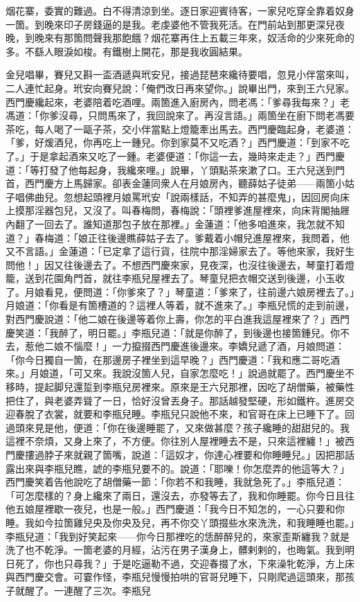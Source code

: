 \begin{myquote} 
烟花寨，委實的難過。白不得清涼到坐。逐日家迎賓待客，一家兒吃穿全靠着奴身一箇。到晚來印子房錢逼的是我。老虔婆他不管我死活。在門前站到那更深兒夜晚，到晚來有那箇問聲我那飽餓？烟花寨再住上五載三年來，奴活命的少來死命的多。不繇人眼淚如梭。有鐵樹上開花，那是我收圓結果。
\end{myquote} 

金兒唱畢，賽兒又斟一盃酒遞與玳安兒，接過琵琶來纔待要唱，忽見小伴當來叫，二人連忙起身。玳安向賽兒說：「俺們改日再來望你。」說畢出門，來到王六兒家。西門慶纔起來，老婆陪着吃酒哩。兩箇進入廚房內，問老馮：「爹尋我每來？」老馮道：「你爹沒尋，只問馬來了，我回說來了。再沒言語。」兩箇坐在廚下問老馮要茶吃，每人喝了一甌子茶，交小伴當點上燈籠牽出馬去。西門慶臨起身，老婆道：「爹，好煖酒兒，你再吃上一鍾兒。你到家莫不又吃酒？」西門慶道：「到家不吃了。」于是拿起酒來又吃了一鍾。老婆便道：「你這一去，幾時來走走？」西門慶道：「等打發了他每起身，我纔來哩。」說畢，丫頭點茶來漱了口。王六兒送到門首，西門慶方上馬歸家。卻表金蓮同衆人在月娘房內，聽薛姑子徒弟——兩箇小姑子唱佛曲兒。忽想起頭裡月娘罵玳安「說兩樣話，不知弄的甚麼鬼」，因回房向床上摸那淫器包兒，又沒了。叫春梅問，春梅說：「頭裡爹進屋裡來，向床背閣抽屜內翻了一回去了。誰知道那包子放在那裡。」金蓮道：「他多咱進來，我怎就不知道？」春梅道：「娘正往後邊瞧薛姑子去了。爹戴着小帽兒進屋裡來，我問着，他又不言語。」金蓮道：「已定拿了這行貨，往院中那淫婦家去了。等他來家，我好生問他！」因又往後邊去了。不想西門慶來家，見夜深，也沒往後邊去，琴童打着燈籠，送到花園角門首，就往李瓶兒屋裡去了。琴童兒把衣帽交送到後邊，小玉收了。月娘看見，便問道：「你爹來了？」琴童道：「爹來了，往前邊六娘房裡去了。」月娘道：「你看是有箇槽道的？這裡人等着，就不進來了。」李瓶兒慌的走到前邊，對西門慶說道：「他二娘在後邊等着你上壽，你怎的平白進我這屋裡來了？」西門慶笑道：「我醉了，明日罷。」李瓶兒道：「就是你醉了，到後邊也接箇鍾兒。你不去，惹他二娘不惱麼！」一力攛掇西門慶進後邊來。李嬌兒遞了酒，月娘問道：「你今日獨自一箇，在那邊房子裡坐到這早晚？」西門慶道：「我和應二哥吃酒來。」月娘道，「可又來。我說沒箇人兒，自家怎麼吃！」說過就罷了。西門慶坐不移時，提起脚兒還踅到李瓶兒房裡來。原來是王六兒那裡，因吃了胡僧藥，被藥性把住了，與老婆弄聳了一日，恰好沒曾丟身子。那話越發堅硬，形如鐵杵。進房交迎春脫了衣裳，就要和李瓶兒睡。李瓶兒只說他不來，和官哥在床上已睡下了。回過頭來見是他，便道：「你在後邊睡罷了，又來做甚麼？孩子纔睡的甜甜兒的。我這裡不奈煩，又身上來了，不方便。你往別人屋裡睡去不是，只來這裡纏！」被西門慶摟過脖子來就親了箇嘴，說道：「這奴才，你達心裡要和你睡睡兒。」因把那話露出來與李瓶兒瞧，諕的李瓶兒要不的。說道：「耶嚛！你怎麼弄的他這等大？」西門慶笑着告他說吃了胡僧藥一節：「你若不和我睡，我就急死了。」李瓶兒道：「可怎麼樣的？身上纔來了兩日，還沒去，亦發等去了，我和你睡罷。你今日且往他五娘屋裡歇一夜兒，也是一般。」西門慶道：「我今日不知怎的，一心只要和你睡。我如今拉箇雞兒央及你央及兒，再不你交丫頭掇些水來洗洗，和我睡睡也罷。」李瓶兒道：「我到好笑起來——你今日那裡吃的恁醉醉兒的，來家歪斯纏我？就是洗了也不乾淨。一箇老婆的月經，沾污在男子漢身上，髒剌剌的，也晦氣。我到明日死了，你也只尋我？」于是吃逼勒不過，交迎春掇了水，下來澡牝乾淨，方上床與西門慶交會。可霎作怪，李瓶兒慢慢拍哄的官哥兒睡下，只剛爬過這頭來，那孩子就醒了。一連醒了三次。李瓶兒